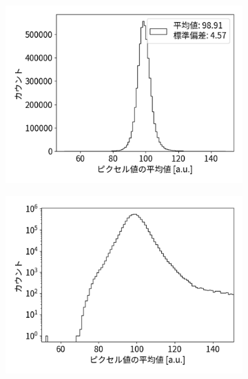 \documentclass[a4paper,11pt,uplatex]{jsbook}
\begin{document}
\begin{figure}[b]
  \centering
  \begin{subfigure}[b]{0.33\linewidth}
    \centering
    \includegraphics[width=\linewidth]{image/4-BGmean.png}
  \end{subfigure}
  \hfill
  \begin{subfigure}[b]{0.33\linewidth}
    \centering
    \includegraphics[width=\linewidth]{image/4-BGmeanlog.png}
  \end{subfigure}
  \hfill
  \begin{subfigure}[b]{0.33\linewidth}
    \centering

\end{subfigure}
\end{figure}
\end{document}
